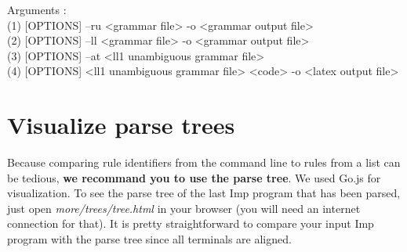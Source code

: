 Arguments : \\
\indent (1) [OPTIONS] --ru <grammar file> -o <grammar output file> \\
\indent (2) [OPTIONS] --ll <grammar file> -o <grammar output file> \\
\indent (3) [OPTIONS] --at <ll1 unambiguous grammar file> \\
\indent (4) [OPTIONS] <ll1 unambiguous grammar file> <code> -o <latex output file>

\section{Visualize parse trees}

Because comparing rule identifiers from the command line to rules from a list can be tedious,
\textbf{we recommand you to use the parse tree}. We used Go.js for visualization.
To see the parse tree of the last Imp program that has been parsed, just open \textit{more/trees/tree.html}
in your browser (you will need an internet connection for that).
It is pretty straightforward to compare your input Imp program with the parse tree since all terminals
are aligned.